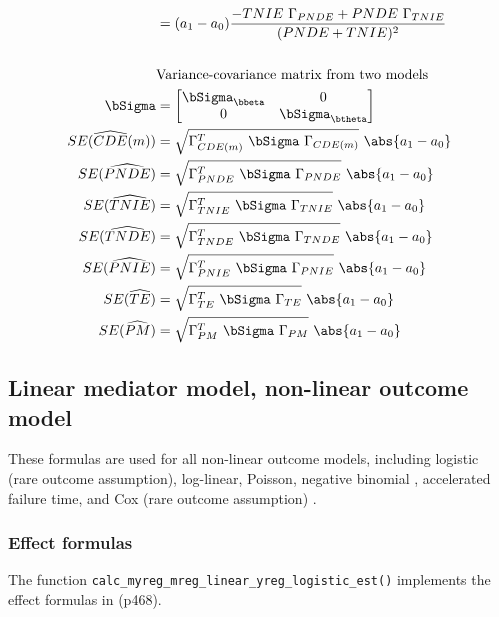 \documentclass[10pt]{article}
\begin{document}
\begin{align*}
  &= (a_{1}-a_{0}) \frac{-TNIE~\Gamma_{PNDE} + PNDE~\Gamma_{TNIE}}{(PNDE+TNIE)^{2}}\\
  \\
  &\text{Variance-covariance matrix from two models}\\
  \bSigma &=
           \begin{bmatrix}
             \bSigma_{\bbeta} & 0 \\
             0 & \bSigma_{\btheta} \\
           \end{bmatrix}\\
  SE(\widehat{CDE}(m)) &= \sqrt{\Gamma_{CDE(m)}^{T} ~\bSigma~ \Gamma_{CDE(m)}} ~ \abs{a_{1} - a_{0}}\\
  SE(\widehat{PNDE}) &= \sqrt{\Gamma_{PNDE}^{T} ~\bSigma~ \Gamma_{PNDE}} ~ \abs{a_{1} - a_{0}}\\
  SE(\widehat{TNIE}) &= \sqrt{\Gamma_{TNIE}^{T} ~\bSigma~ \Gamma_{TNIE}} ~ \abs{a_{1} - a_{0}}\\
  SE(\widehat{TNDE}) &= \sqrt{\Gamma_{TNDE}^{T} ~\bSigma~ \Gamma_{TNDE}} ~ \abs{a_{1} - a_{0}}\\
  SE(\widehat{PNIE}) &= \sqrt{\Gamma_{PNIE}^{T} ~\bSigma~ \Gamma_{PNIE}} ~ \abs{a_{1} - a_{0}}\\
  SE(\widehat{TE}) &= \sqrt{\Gamma_{TE}^{T} ~\bSigma~ \Gamma_{TE}} ~ \abs{a_{1} - a_{0}}\\
  SE(\widehat{PM}) &= \sqrt{\Gamma_{PM}^{T} ~\bSigma~ \Gamma_{PM}} ~ \abs{a_{1} - a_{0}}\\
\end{align*}


\subsection{Linear mediator model, non-linear outcome model}
\label{sec:orgb6204be}
These formulas are used for all non-linear outcome models, including logistic (rare outcome assumption), log-linear, Poisson, negative binomial \cite{valeriMediationAnalysisAllowing2013}, accelerated failure time, and Cox (rare outcome assumption) \cite{valeriSASMacroCausal2015}.

\subsubsection{Effect formulas}
\label{sec:orge2a047d}
The function \texttt{calc\_myreg\_mreg\_linear\_yreg\_logistic\_est()} implements the effect formulas in \cite{vanderweeleExplanationCausalInference2015} (p468).
\end{document}
